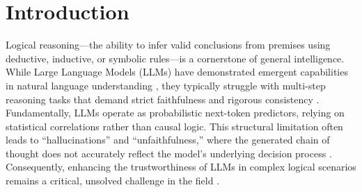 \documentclass{article}
\theoremstyle{plain}
\theoremstyle{definition}
\theoremstyle{remark}
\begin{document}
\printAffiliationsAndNotice{}  %

\begin{abstract}

Large Language Models (LLMs) have demonstrated remarkable proficiency in natural language understanding but struggle with strict multi-step reasoning. They frequently suffer from hallucinations and inconsistency. Existing Chain-of-Thought (CoT) methods lack rigorous verification, while traditional symbolic systems lack flexibility with natural language. To bridge this gap, we propose a Neuro-Symbolic architecture integrating Logical Knowledge Graphs (LKG) with dynamic solver routing. Unlike traditional static graphs, our LKG employs an ontology-based hierarchy that decouples abstract logic from specific entities. By treating Rules and Constraints as first-class nodes, we explicitly model complex dependencies extracted from text. We introduce a Logic Router to dynamically select the optimal symbolic engine—Z3 for constraints, Prover9 for entailment, or Pyke for inference. Combined with hybrid retrieval, our system grounds LLM generation in deterministic symbolic execution.

\end{abstract}

\section{Introduction}

Logical reasoning—the ability to infer valid conclusions from premises using deductive, inductive, or symbolic rules—is a cornerstone of general intelligence. While Large Language Models (LLMs) have demonstrated emergent capabilities in natural language understanding \cite{brown2020language, achiam2023gpt}, they typically struggle with multi-step reasoning tasks that demand strict faithfulness and rigorous consistency \cite{huang2022towards, valmeekam2023planning}. Fundamentally, LLMs operate as probabilistic next-token predictors, relying on statistical correlations rather than causal logic. This structural limitation often leads to ``hallucinations'' \cite{zhang2023siren} and ``unfaithfulness,'' where the generated chain of thought does not accurately reflect the model's underlying decision process \cite{Turpin2023language, lanham2023measuring}. Consequently, enhancing the trustworthiness of LLMs in complex logical scenarios remains a critical, unsolved challenge in the field \cite{Dziri2023faith, Nye2021show, Huang2023large}.
\end{document}
